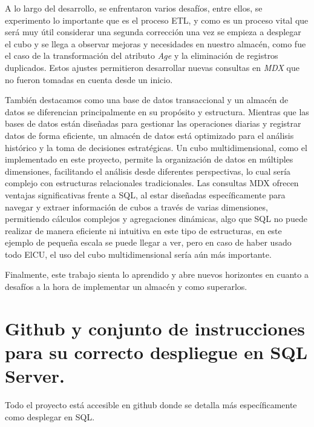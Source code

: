 \documentclass[12pt, a4paper, twoside]{article}
\begin{document}
	A lo largo del desarrollo, se enfrentaron varios desafíos, entre ellos, se experimento lo importante que es el proceso ETL, y como es un proceso vital que será muy útil considerar una segunda corrección una vez se empieza a desplegar el cubo y se llega a observar mejoras y necesidades en nuestro almacén, como fue el caso de la transformación del atributo \textit{Age} y la eliminación de registros duplicados. Estos ajustes permitieron desarrollar nuevas consultas en \textit{MDX} que no fueron tomadas en cuenta desde un inicio.
	
	También destacamos como una base de datos transaccional y un almacén de datos se diferencian principalmente en su propósito y estructura. Mientras que las bases de datos están diseñadas para gestionar las operaciones diarias y registrar datos de forma eficiente, un almacén de datos está optimizado para el análisis histórico y la toma de decisiones estratégicas. Un cubo multidimensional, como el implementado en este proyecto, permite la organización de datos en múltiples dimensiones, facilitando el análisis desde diferentes perspectivas, lo cual sería complejo con estructuras relacionales tradicionales. Las consultas MDX ofrecen ventajas significativas frente a SQL, al estar diseñadas específicamente para navegar y extraer información de cubos a través de varias dimensiones, permitiendo cálculos complejos y agregaciones dinámicas, algo que SQL no puede realizar de manera eficiente ni intuitiva en este tipo de estructuras, en este ejemplo de pequeña escala se puede llegar a ver, pero en caso de haber usado todo ElCU, el uso del cubo multidimensional sería aún más importante.
	
	
	Finalmente, este trabajo sienta lo aprendido y abre nuevos horizontes en cuanto a desafíos a la hora de implementar un almacén y como superarlos. 
	


	\section{Github y conjunto de instrucciones para su correcto despliegue en SQL Server.}

	Todo el proyecto está accesible en github \cite{depab2024} donde se detalla más específicamente como desplegar en SQL.
	\printbibliography
	
	
	
	
\end{document}
